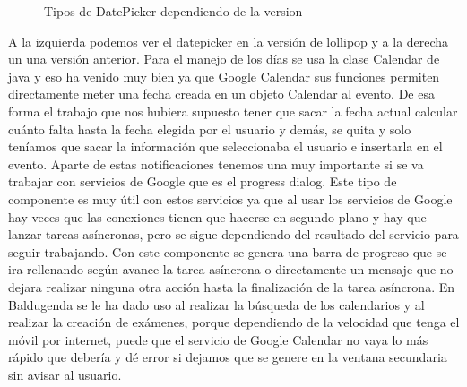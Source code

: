 \begin{figure}[H]
 \centering
 \caption{Tipos de DatePicker dependiendo de la version}
 \label{f:Tipos de DatePicker dependiendo de la version}
\end{figure}

A la izquierda podemos ver el datepicker en la versión de lollipop y a la derecha un una versión anterior.
Para el manejo de los días se usa la clase Calendar de java y eso ha venido muy bien ya que Google Calendar sus funciones permiten directamente meter una fecha creada en un objeto Calendar al evento.
De esa forma el trabajo que nos hubiera supuesto tener que sacar la fecha actual calcular cuánto falta hasta la fecha elegida por el usuario y demás, se quita y solo teníamos que sacar la información que seleccionaba el usuario e insertarla en el evento.
Aparte de estas notificaciones tenemos  una muy importante si se va trabajar con servicios de Google que es el progress dialog.
Este tipo de componente es muy útil con estos servicios ya que al usar los servicios de Google hay veces que las conexiones tienen que hacerse en segundo plano y hay que lanzar tareas asíncronas, pero se sigue dependiendo del resultado del servicio para seguir trabajando.
Con este componente se genera una barra de progreso que se ira rellenando según avance la tarea asíncrona o directamente un mensaje que no dejara realizar ninguna otra acción hasta la finalización de la tarea asíncrona.
En Baldugenda se le ha dado uso al realizar la búsqueda de los calendarios y al realizar la creación de exámenes, porque dependiendo de la velocidad que tenga el móvil por internet, puede que el servicio de Google Calendar no vaya lo más rápido que debería y dé error si dejamos que se genere en la ventana secundaria sin avisar al usuario. 

